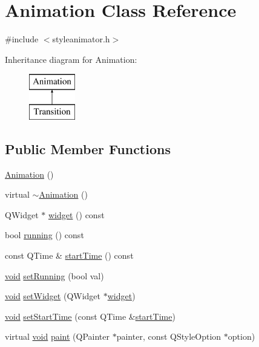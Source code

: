 \hypertarget{class_animation}{\section{\-Animation \-Class \-Reference}
\label{class_animation}
}


{\ttfamily \#include $<$styleanimator.\-h$>$}

\-Inheritance diagram for \-Animation\-:\begin{figure}[H]
\begin{center}
\leavevmode
\includegraphics[height=2.000000cm]{class_animation}
\end{center}
\end{figure}
\subsection*{\-Public \-Member \-Functions}
\begin{DoxyCompactItemize}
\item 
\hyperlink{group___core_plugin_ga83f0a16cef7117f187ad596de38dd9d6}{\-Animation} ()
\item 
virtual \hyperlink{group___core_plugin_gae4553ab990ad98809f27aa5445011881}{$\sim$\-Animation} ()
\item 
\-Q\-Widget $\ast$ \hyperlink{group___core_plugin_ga139eb8db6fd9617f4eacdcc5159492a9}{widget} () const 
\item 
bool \hyperlink{group___core_plugin_ga3261fc81ed05713dec36b68d4a86b2d9}{running} () const 
\item 
const \-Q\-Time \& \hyperlink{group___core_plugin_ga417bfeb8642e6da528f4237a83f1e068}{start\-Time} () const 
\item 
\hyperlink{group___u_a_v_objects_plugin_ga444cf2ff3f0ecbe028adce838d373f5c}{void} \hyperlink{group___core_plugin_ga3c2b385077e8de8beae1d09f55d735d2}{set\-Running} (bool val)
\item 
\hyperlink{group___u_a_v_objects_plugin_ga444cf2ff3f0ecbe028adce838d373f5c}{void} \hyperlink{group___core_plugin_gaecef76fa5071fa89f35232831c54d92e}{set\-Widget} (\-Q\-Widget $\ast$\hyperlink{group___core_plugin_ga139eb8db6fd9617f4eacdcc5159492a9}{widget})
\item 
\hyperlink{group___u_a_v_objects_plugin_ga444cf2ff3f0ecbe028adce838d373f5c}{void} \hyperlink{group___core_plugin_gaf99c302f7084539908a94b5fa4239037}{set\-Start\-Time} (const \-Q\-Time \&\hyperlink{group___core_plugin_ga417bfeb8642e6da528f4237a83f1e068}{start\-Time})
\item 
virtual \hyperlink{group___u_a_v_objects_plugin_ga444cf2ff3f0ecbe028adce838d373f5c}{void} \hyperlink{group___core_plugin_ga48e4128d0ce2e0f0d728d099f16d1f11}{paint} (\-Q\-Painter $\ast$painter, const \-Q\-Style\-Option $\ast$option)
\end{DoxyCompactItemize}
